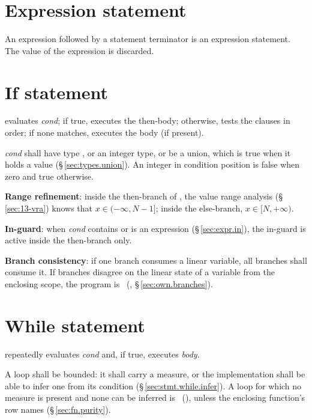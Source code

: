 \section{Expression statement}
\label{sec:stmt.expr}

\pnum
An expression followed by a statement terminator is an expression
statement.  The value of the expression is discarded.

\section{If statement}
\label{sec:stmt.if}

\pnum
{}
evaluates \textit{cond}; if true, executes the then-body; otherwise,
tests the  clauses in order; if none matches, executes the
 body (if present).

\begin{constraint}
  \textit{cond} shall have type , or an integer type, or be a union, which is
  true when it holds a value (\S\,\ref{sec:types.union}).  An integer in condition position is false when
  zero and true otherwise.
\end{constraint}

\pnum
\textbf{Range refinement}: inside the then-branch of ,
the value range analysis (\S\,\ref{sec:13-vra}) knows that
$x \in (-\infty, N-1]$; inside the else-branch, $x \in [N, +\infty)$.

\pnum
\textbf{In-guard}: when \textit{cond} contains or is an 
expression (\S\,\ref{sec:expr.in}), the in-guard is active inside the
then-branch only.

\pnum
\textbf{Branch consistency}: if one branch consumes a linear variable,
all branches shall consume it.  If branches disagree on the linear state
of a variable from the enclosing scope, the program is
\illformed{}~(, \S\,\ref{sec:own.branches}).

\section{While statement}
\label{sec:stmt.while}

\pnum
{} repeatedly evaluates \textit{cond} and, if
true, executes \textit{body}.

\begin{constraint}
  A  loop shall be bounded: it shall carry a
   measure, or the implementation shall be able to infer one
  from its condition (\S\,\ref{sec:stmt.while.infer}).  A loop for which no
  measure is present and none can be inferred is
  \illformed{}~(), unless the enclosing function's row names
   (\S\,\ref{sec:fn.purity}).
\end{constraint}

